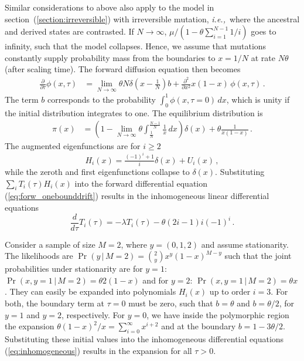 \documentclass[preprint]{elsarticle}
\newcommand\given{{\,|\,}}
\newcommand\ie{{\it i.e.,}}
\begin{document}
Similar considerations to above also apply to the model in section~(\ref{section:irreversible}) with irreversible mutation, \ie\ where the ancestral and derived states are contrasted. If $N\to\infty$, $\mu/(1-\theta\sum_{i=1}^{N-1}1/i)$ goes to infinity, such that the model collapses. Hence, we assume that mutations constantly supply probability mass from the boundaries to $x=1/N$ at rate $N\theta$ (after scaling time). The forward diffusion equation then becomes
\begin{equation}\label{eq:forw_onebounddrift}
\begin{split}
\frac{\partial}{\partial \tau} \phi(x,\tau)&=
    \lim_{N\to\infty}\theta N\delta(x-\tfrac1N)b+\frac{\partial^2}{\partial x^2}x(1-x)\,\phi(x,\tau)\,.
\end{split}
\end{equation}
The term $b$ corresponds to the probability $\int_0^1\phi(x,\tau=0)\,dx$, which is unity if the initial distribution integrates to one. The equilibrium distribution is 
\begin{equation}
\begin{split}
    \pi(x)&=\left(1-\lim_{N\to\infty}\theta \int_{\tfrac1N}^{\tfrac{N-1}N} \frac1x\,dx\right)\delta(x)+\theta\frac{1}{x(1-x)}\,.
\end{split}
\end{equation}
The augmented eigenfunctions are for $i\geq 2$
\begin{equation}\label{eq:forw_onebound_eigen}
    H_i(x)=\tfrac{(-1)^i+1}{i}\delta(x)+U_i(x)\,,
\end{equation}
while the zeroth and first eigenfunctions collapse to $\delta(x)$. 
Substituting $\sum_iT_i(\tau) H_i(x)$ into the forward differential equation (\ref{eq:forw_onebounddrift}) results in the inhomogeneous linear differential equations
\begin{equation}\label{eq:inhomogeneous}
    \frac{d}{d\tau}T_i(\tau)=-\lambda T_i(\tau)-\theta (2i-1)i(-1)^i\,.
\end{equation}

Consider a sample of size $M=2$, where $y=(0,1,2)$ and assume stationarity. The likelihoods are $\Pr(y\given M=2)=\binom{2}{y}x^{y}(1-x)^{M-y}$ such that the joint probabilities under stationarity are for $y=1$: $\Pr(x,y=1\given M=2)=\theta 2(1-x)$ and for $y=2$: $\Pr(x,y=1\given M=2)=\theta x$. They can easily be expanded into polynomials $H_i(x)$ up to order $i=3$. For both, the boundary term at $\tau=0$ must be zero, such that $b=\theta$ and $b=\theta/2$, for $y=1$ and $y=2$, respectively. For $y=0$, we have inside the polymorphic region the expansion $\theta (1-x)^2/x=\sum_{i=0}^\infty x^{i+2}$ and at the boundary $b=1-3\theta/2$. Substituting these initial values into the inhomogeneous differential equations (\ref{eq:inhomogeneous}) results in the expansion for all $\tau>0$.
\end{document}
